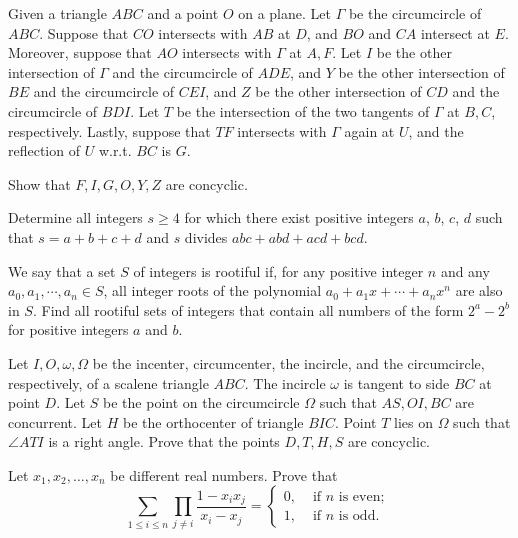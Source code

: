 \documentclass[11pt]{scrartcl}
\begin{document}
\begin{problem}[2003233604438068678]
Given a triangle $ABC$ and a point $O$ on a plane. Let $\Gamma$ be the circumcircle of $ABC$. Suppose that $CO$ intersects with $AB$ at $D$, and $BO$ and $CA$ intersect at $E$. Moreover, suppose that $AO$ intersects with $\Gamma$ at $A,F$. Let $I$ be the other intersection of $\Gamma$ and the circumcircle of $ADE$, and $Y$ be the other intersection of $BE$ and the circumcircle of $CEI$, and $Z$ be the other intersection of $CD$ and the circumcircle of $BDI$. Let $T$ be the intersection of the two tangents of $\Gamma$ at $B,C$, respectively. Lastly, suppose that $TF$ intersects with $\Gamma$ again at $U$, and the reflection of $U$ w.r.t. $BC$ is $G$.

Show that $F,I,G,O,Y,Z$ are concyclic.
\end{problem}
\begin{problem}[211625179383762]
Determine all integers $s \ge 4$ for which there exist positive integers $a$, $b$, $c$, $d$ such that $s = a+b+c+d$ and $s$ divides $abc+abd+acd+bcd$.
\end{problem}
\begin{problem}[4892352754475215646]
	We say that a set $S$ of integers is rootiful if, for any positive integer $n$ and any $a_0, a_1, \cdots, a_n \in S$, all integer roots of the polynomial $a_0+a_1x+\cdots+a_nx^n$ are also in $S$. Find all rootiful sets of integers that contain all numbers of the form $2^a - 2^b$ for positive integers $a$ and $b$.
\end{problem}
\begin{problem}[1168447466971762345]
	Let $I, O, \omega, \Omega$ be the incenter, circumcenter, the incircle, and the circumcircle, respectively, of a scalene triangle $ABC$. The incircle $\omega$ is tangent to side $BC$ at point $D$. Let $S$ be the point on the circumcircle $\Omega$ such that $AS, OI, BC$ are concurrent. Let $H$ be the orthocenter of triangle $BIC$. Point $T$ lies on $\Omega$ such that $\angle ATI$ is a right angle. Prove that the points $D, T, H, S$ are concyclic.
\end{problem}
\begin{problem}[443006607452241]
Let $x_1, x_2, \dots, x_n$ be different real numbers. Prove that
\[\sum_{1 \leqslant i \leqslant n} \prod_{j \neq i} \frac{1-x_{i} x_{j}}{x_{i}-x_{j}}=\left\{\begin{array}{ll}
0, & \text { if } n \text { is even; } \\
1, & \text { if } n \text { is odd. }
\end{array}\right.\]
\end{problem}
\end{document}
